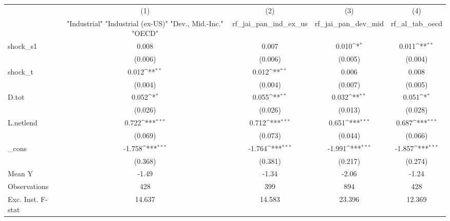{
\def\sym#1{\ifmmode^{#1}\else\(^{#1}\)\fi}
\begin{tabular}{l*{4}{c}}
\toprule
            &\multicolumn{1}{c}{(1)}&\multicolumn{1}{c}{(2)}&\multicolumn{1}{c}{(3)}&\multicolumn{1}{c}{(4)}\\
            &\multicolumn{1}{c}{ "Industrial" "Industrial (ex-US)" "Dev., Mid.-Inc." "OECD" }&\multicolumn{1}{c}{rf\_jai\_pan\_ind\_ex\_us}&\multicolumn{1}{c}{rf\_jai\_pan\_dev\_mid}&\multicolumn{1}{c}{rf\_al\_tab\_oecd}\\
\midrule
shock\_s1    &       0.008         &       0.007         &       0.010\sym{*}  &       0.011\sym{**} \\
            &     (0.006)         &     (0.006)         &     (0.005)         &     (0.004)         \\
\addlinespace
shock\_t     &       0.012\sym{**} &       0.012\sym{**} &       0.006         &       0.008         \\
            &     (0.004)         &     (0.004)         &     (0.007)         &     (0.005)         \\
\addlinespace
D.tot       &       0.052\sym{*}  &       0.055\sym{**} &       0.032\sym{**} &       0.051\sym{*}  \\
            &     (0.026)         &     (0.026)         &     (0.013)         &     (0.028)         \\
\addlinespace
L.netlend   &       0.722\sym{***}&       0.712\sym{***}&       0.651\sym{***}&       0.687\sym{***}\\
            &     (0.069)         &     (0.073)         &     (0.044)         &     (0.066)         \\
\addlinespace
\_cons      &      -1.758\sym{***}&      -1.764\sym{***}&      -1.991\sym{***}&      -1.857\sym{***}\\
            &     (0.368)         &     (0.381)         &     (0.217)         &     (0.274)         \\
\midrule
Mean Y      &       -1.49         &       -1.34         &       -2.06         &       -1.24         \\
Observations&         428         &         399         &         894         &         428         \\
Exc. Inst. F-stat&      14.637         &      14.583         &      23.396         &      12.369         \\
\bottomrule
\end{tabular}
}
